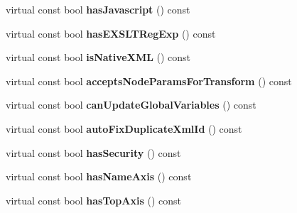 \begin{DoxyCompactItemize}
\item 
\hypertarget{classgeneral__server_1_1XmlLibrary_a5a49f82f1e571ce09ece1507157d34be}{virtual const bool {\bfseries has\-Javascript} () const }\label{classgeneral__server_1_1XmlLibrary_a5a49f82f1e571ce09ece1507157d34be}

\item 
\hypertarget{classgeneral__server_1_1XmlLibrary_a60b48e7529cdd9bbbf7a7856b6b99b31}{virtual const bool {\bfseries has\-E\-X\-S\-L\-T\-Reg\-Exp} () const }\label{classgeneral__server_1_1XmlLibrary_a60b48e7529cdd9bbbf7a7856b6b99b31}

\item 
\hypertarget{classgeneral__server_1_1XmlLibrary_aee116ded5d32681d0c71c550966afe8b}{virtual const bool {\bfseries is\-Native\-X\-M\-L} () const }\label{classgeneral__server_1_1XmlLibrary_aee116ded5d32681d0c71c550966afe8b}

\item 
\hypertarget{classgeneral__server_1_1XmlLibrary_ab03ad4ea41a318e007a74431d54e75e4}{virtual const bool {\bfseries accepts\-Node\-Params\-For\-Transform} () const }\label{classgeneral__server_1_1XmlLibrary_ab03ad4ea41a318e007a74431d54e75e4}

\item 
\hypertarget{classgeneral__server_1_1XmlLibrary_ae08b0f3a264e19b31e74b727a3040ebe}{virtual const bool {\bfseries can\-Update\-Global\-Variables} () const }\label{classgeneral__server_1_1XmlLibrary_ae08b0f3a264e19b31e74b727a3040ebe}

\item 
\hypertarget{classgeneral__server_1_1XmlLibrary_aafce2700b88ccd26df287a7ab7d02280}{virtual const bool {\bfseries auto\-Fix\-Duplicate\-Xml\-Id} () const }\label{classgeneral__server_1_1XmlLibrary_aafce2700b88ccd26df287a7ab7d02280}

\item 
\hypertarget{classgeneral__server_1_1XmlLibrary_a3575e4095a5219a7f2b9877a6c1e22d2}{virtual const bool {\bfseries has\-Security} () const }\label{classgeneral__server_1_1XmlLibrary_a3575e4095a5219a7f2b9877a6c1e22d2}

\item 
\hypertarget{classgeneral__server_1_1XmlLibrary_a8fe59dd5b3e892efdd60c7c20d4f6730}{virtual const bool {\bfseries has\-Name\-Axis} () const }\label{classgeneral__server_1_1XmlLibrary_a8fe59dd5b3e892efdd60c7c20d4f6730}

\item 
\hypertarget{classgeneral__server_1_1XmlLibrary_a127192f50ca9680825c2acd5940696c9}{virtual const bool {\bfseries has\-Top\-Axis} () const }\label{classgeneral__server_1_1XmlLibrary_a127192f50ca9680825c2acd5940696c9}


\end{DoxyCompactItemize}
